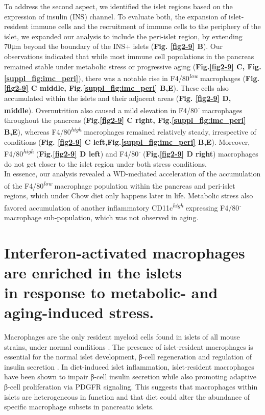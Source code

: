 To address the second aspect, we identified the islet regions based on the expression of insulin (INS) channel. To evaluate both, the expansion of islet-resident immune cells and the recruitment of immune cells to the periphery of the islet, we expanded our analysis to include the peri-islet region, by extending 70μm beyond the boundary of the INS+ islets (\textbf{Fig. \ref{fig2-9} B}). Our observations indicated that while most immune cell populations in the pancreas remained stable under metabolic stress or progressive aging (\textbf{Fig.\ref{fig2-9} C, Fig.\ref{suppl_fig:imc_peri}}), there was a notable rise in F4/80\textsuperscript{\textit{low}} macrophages (\textbf{Fig. \ref{fig2-9} C middle, Fig.\ref{suppl_fig:imc_peri} B,E}). These cells also accumulated within the islets and their adjacent areas (\textbf{Fig. \ref{fig2-9} D, middle}). Overnutrition also caused a mild elevation in F4/80\textsuperscript{\textit{-}} macrophages throughout the pancreas (\textbf{Fig.\ref{fig2-9} C right, Fig.\ref{suppl_fig:imc_peri} B,E}), whereas F4/80\textsuperscript{\textit{high}} macrophages remained relatively steady, irrespective of conditions (\textbf{Fig. \ref{fig2-9} C left,Fig.\ref{suppl_fig:imc_peri} B,E}). Moreover, F4/80\textsuperscript{\textit{high}} (\textbf{Fig.\ref{fig2-9} D left})  and F4/80\textsuperscript{\textit{-}} (\textbf{Fig.\ref{fig2-9} D right}) macrophages do not get closer to the islet region under both stress conditions.\\


In essence, our analysis revealed a WD-mediated acceleration of the accumulation of the F4/80\textsuperscript{\textit{low}} macrophage population within the pancreas and peri-islet regions, which under Chow diet only happens later in life. Metabolic stress also favored accumulation of another inflammatory CD11c\textsuperscript{\textit{high}} expressing F4/80\textsuperscript{\textit{-}} macrophage sub-population, which was not observed in aging.  


\section{Interferon-activated macrophages are enriched in the islets\\in response to metabolic- and aging-induced stress.}
\label{sec:sc_macs}

Macrophages are the only resident myeloid cells found in islets of all mouse strains, under normal conditions \textbf{\cite{zakharov_single-cell_2020}}. The presence of islet-resident macrophages is essential for the normal islet development, β-cell regeneration and regulation of insulin secretion \textbf{\cite{ying_expansion_2019}}. In diet-induced islet inflammation, islet-resident macrophages have been shown to impair β-cell insulin secretion while also promoting adaptive β-cell proliferation via PDGFR signaling. This suggests that macrophages within islets are heterogeneous in function and that diet could alter the abundance of specific macrophage subsets in pancreatic islets.

